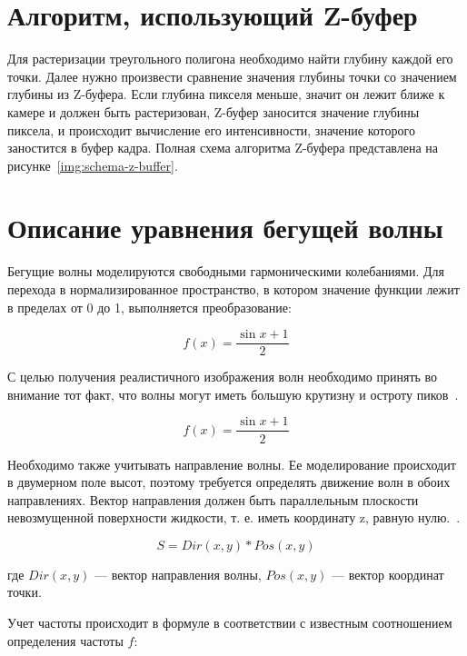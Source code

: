 \section{Алгоритм, использующий Z-буфер}
Для растеризации треугольного полигона необходимо найти глубину каждой его точки.
Далее нужно произвести сравнение значения глубины точки со значением глубины из Z-буфера. 
Если глубина пикселя меньше, значит он лежит ближе к камере и должен быть растеризован, Z-буфер заносится значение глубины пиксела, и происходит вычисление его интенсивности, значение которого заностится в буфер кадра. 
Полная схема алгоритма Z-буфера представлена на рисунке~\ref{img:schema-z-buffer}.


\newpage

\section{Описание уравнения бегущей волны}
Бегущие волны моделируются свободными гармоническими колебаниями. 
Для перехода в нормализированное пространство, в котором значение функции лежит в пределах от 0 до 1, 
выполняется преобразование:

\begin{equation}
    f(x) = \dfrac{\sin{x} + 1}{2}
\end{equation}

С целью получения реалистичного изображения волн необходимо принять во внимание тот факт, 
что волны могут иметь большую крутизну и остроту пиков~\cite{WAVE}.

\begin{equation}
    f(x) = \dfrac{\sin{x} + 1}{2}
\end{equation}

Необходимо также учитывать направление волны. Ее моделирование происходит в двумерном поле высот, 
поэтому требуется определять движение волн в обоих направлениях. Вектор направления должен быть 
параллельным плоскости невозмущенной поверхности жидкости, т. е. иметь координату z, равную нулю.~\cite{WAVE}.

\begin{equation}
    S = Dir(x,y)*Pos(x,y)
\end{equation}

где $Dir(x, y)$ — вектор направления волны, $Pos(x, y)$ — вектор координат точки.

Учет частоты происходит в формуле в соответствии с известным соотношением определения частоты $f$:

